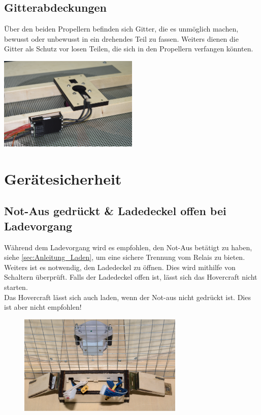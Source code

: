\subsection{Gitterabdeckungen}
Über den beiden Propellern befinden sich Gitter, die es unmöglich machen, bewusst oder unbewusst in ein drehendes Teil zu fassen. 
Weiters dienen die Gitter als Schutz vor losen Teilen, die sich in den Propellern verfangen könnten. 

\begin{minipage}{13cm}
    \centering
    \includegraphics[width=0.5\textwidth]{Fotos/Gitter_unten.jpg}
\end{minipage}


\section{Gerätesicherheit \label{sec:Geraetesicherheit}}

\subsection{Not-Aus gedrückt \& Ladedeckel offen bei Ladevorgang}
Während dem Ladevorgang wird es empfohlen, den Not-Aus betätigt zu haben, siehe \ref{sec:Anleitung_Laden}, um eine sichere Trennung vom Relais zu bieten. \\
Weiters ist es notwendig, den Ladedeckel zu öffnen. Dies wird mithilfe von Schaltern überprüft. Falls der Ladedeckel offen ist, lässt sich das Hovercraft nicht starten. \\
Das Hovercraft lässt sich auch laden, wenn der Not-aus nicht gedrückt ist. Dies ist aber nicht empfohlen!

\begin{figure}[h]
    \centering
    \includegraphics[width=0.7\textwidth]{Fotos/Ladedeckel_DSC_8794.png}
\end{figure}


